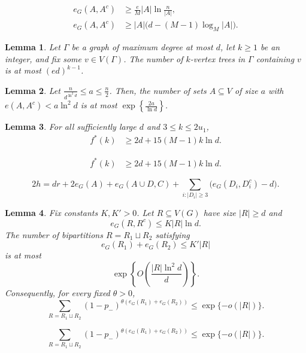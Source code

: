 \documentclass[10pt,a4paper]{amsart}
\newtheorem{lemma}{Lemma}
\begin{document}
\begin{align}
  e_G(A,A^c)&\ge \frac{e}{M}|A|\ln\frac{n}{|A|},\\
  e_G(A,A^c)&\ge |A|\bigl(d-(M-1)\log_M|A|\bigr).
\end{align}

\begin{lemma}\label{lem:rooted-trees}
Let $\Gamma$ be a graph of maximum degree at most $d$, let $k\ge1$ be an integer, and fix some $v\in V(\Gamma)$.
The number of $k$-vertex trees in $\Gamma$ containing $v$ is at most $(ed)^{k-1}$.
\end{lemma}

\begin{lemma}\label{lem:small-boundary-sets}
Let $\frac{n}{d^{\ln^2 d}}\le a\le \frac{n}{2}$. Then, the number of sets $A\subseteq V$ of size $a$ with $e(A,A^c)< a\ln^2d$ is at most $\exp\left\{\frac{2a}{\ln d}\right\}$.
\end{lemma}

\begin{lemma}\label{lem:strong-boundary}
For all sufficiently large $d$ and $3\le k\le2u_1$,
\begin{align}
 f^*(k)&\ge2d+15 (M-1) k \ln d.\label{eq:strong-3d}
\end{align}
\end{lemma}

\begin{align}
 f^*(k)&\ge2d+15 (M-1) k \ln d.
\end{align}

\begin{equation}\label{eq:ge-exact}
 2h=dr+2e_G(A)+e_G(A\cup D,C)  +\sum_{i:|D_i|\ge3}\bigl(e_G(D_i,D_i^c)-d\bigr).
\end{equation}

\begin{lemma}
\label{lem:two-colour-count}
Fix constants $K, K'>0$.
Let $R\subseteq V(G)$ have size $|R|\ge d$ and
\[
 e_G(R,R^c)\le K |R|\ln d.
\]
The number of bipartitions $R=R_1\sqcup R_2$ satisfying
\[
 e_G(R_1)+e_G(R_2)\le K' |R|
\]
is at most
\[
 \exp\left\{O\left(\frac{|R|\ln^2 d}{d}\right)\right\}.
\]
Consequently, for every fixed $\theta>0$,
\begin{equation}\label{eq:colouring-weight}
 \sum_{R=R_1\sqcup R_2} (1-p_-)^{\theta(e_G(R_1)+e_G(R_2))}
 \le\exp\{-o(|R|)\}.
\end{equation}
\end{lemma}

\begin{equation}
 \sum_{R=R_1\sqcup R_2} (1-p_-)^{\theta(e_G(R_1)+e_G(R_2))}
 \le\exp\{-o(|R|)\}.
\end{equation}
\end{document}
